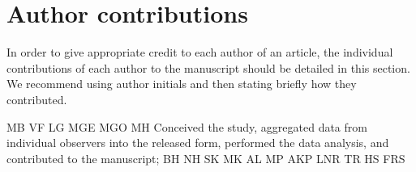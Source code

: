 \section*{Author contributions}
In order to give appropriate credit to each author of an article, the individual contributions of each author to the manuscript should be detailed in this section. We recommend using author initials and then stating briefly how they contributed.

MB
VF
LG
MGE
MGO
MH Conceived the study, aggregated data from individual observers into the released form, performed the data analysis, and contributed to the manuscript;
BH
NH
SK
MK
AL
MP
AKP
LNR
TR
HS
FRS
